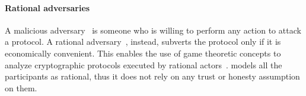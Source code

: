 \smallskip

\paragraph*{Rational adversaries}

A malicious adversary~\cite{Hazay10anote} is someone who is willing to perform any action to attack a protocol. A rational adversary~\cite{Groce2012}, instead, subverts the protocol only if it is economically convenient.
This enables the use of game theoretic concepts to analyze cryptographic protocols executed by rational actors~\cite{Asharov2016,raap,Provi07summaryreport}.
%
\shortname models all the participants as rational, thus it does not rely on any trust or honesty assumption on them.